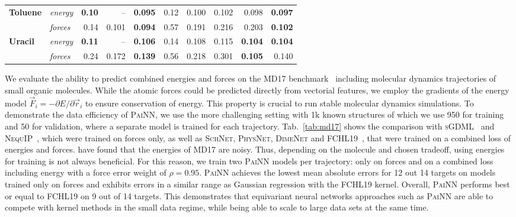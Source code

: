 \documentclass[reprint,
amsmath,amssymb,
 aip,jcp
]{revtex4-2}
\newcommand{\painn}{\textsc{PaiNN}}
\newcommand{\rr}{\vec{r}}
\begin{document}
\begin{table*}[tb]
\begin{center}
\begin{scriptsize}
\begin{sc}
\begin{tabular}{llrrr|rrrrr}
 \multirow{2}{*}{\textbf{Toluene}} & \textit{energy} & \textbf{0.10} & -- & \textbf{0.095} & 0.12 & 0.100 & 0.102 & 0.098 & \textbf{0.097} \\
 & \textit{forces} & 0.14 & 0.101 & \textbf{0.094} & 0.57 & 0.191 & 0.216 & 0.203 & \textbf{0.102} \\ 
 \midrule
 
 \multirow{2}{*}{\textbf{Uracil}} & \textit{energy} & \textbf{0.11} & -- & \textbf{0.106} & 0.14 & 0.108 & 0.115 & \textbf{0.104} & \textbf{0.104} \\
 & \textit{forces} & 0.24 & 0.172 & \textbf{0.139} & 0.56 & 0.218 & 0.301 & \textbf{0.105} & 0.140 \\
\bottomrule
\end{tabular}
\end{sc}
\end{scriptsize}
\end{center}
\vskip -0.1in
\end{table*}

We evaluate the ability to predict combined energies and forces on the MD17 benchmark~\cite{chmiela2017machine} including molecular dynamics trajectories of small organic molecules.
While the atomic forces could be predicted directly from vectorial features, we employ the gradients of the energy model $\vec{F}_i = -\partial E / \partial \rr_i $ to ensure conservation of energy.
This property is crucial to run stable molecular dynamics simulations.
To demonstrate the data efficiency of \painn{}, we use the more challenging setting with 1k known structures of which we use 950 for training and 50 for validation, where a separate model is trained for each trajectory.
Tab.~\ref{tab:md17} shows the comparison with \textsc{sGDML}~\cite{chmiela2018} and  \textsc{NequIP}~\cite{batzner2021se}, which were trained on forces only, as well as \textsc{SchNet}, \textsc{PhysNet}, \textsc{DimeNet} and \textsc{FCHL19}~\cite{christensen2020fchl}, that were trained on a combined loss of energies and forces.
\citet{christensen2020role} have found that the energies of MD17 are noisy. Thus, depending on the molecule and chosen tradeoff, using energies for training is not always beneficial.
For this reason, we train two \painn{} models per trajectory: only on forces and on a combined loss including energy with a force error weight of $\rho=0.95$.
\painn{} achieves the lowest mean absolute errors for 12 out 14 targets on models trained only on forces and exhibits errors in a similar range as Gaussian regression with the \textsc{FCHL19} kernel.
Overall, \painn{} performs best or equal to \textsc{FCHL19} on 9 out of 14 targets.
This demonstrates that equivariant neural networks approaches such as \painn{} are able to compete with kernel methods in the small data regime, while being able to scale to large data sets at the same time.
\end{document}
